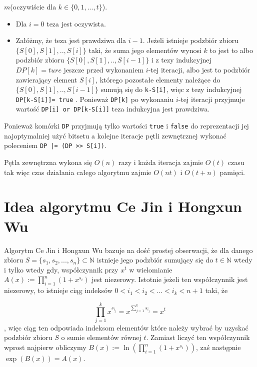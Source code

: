 \documentclass{article}
\begin{document}
 $m$(oczywiście dla $k \in \{0,1,...,t\}$). 
\begin{itemize}
    \item Dla $i = 0$ teza jest oczywista.
    \item Załóżmy, że teza jest prawdziwa dla $i-1$. Jeżeli istnieje podzbiór
    zbioru $\{S \left[ 0 \right],S\left[ 1 \right],..,S\left[ i \right]\}$ taki, że suma jego elementów wynosi $k$ to jest to 
    albo podzbiór zbioru $\{{S\left[0\right],S\left[1\right],..,S\left[i-1\right]\}}$ i z tezy indukcyjnej $DP[k]=ture$
    jeszcze przed wykonaniem $i$-tej iteracji, albo jest to podzbiór zawierający element
    $S\left[i \right]$, którego pozostałe elementy należące do 
    $\{S \left[ 0 \right] ,S \left[ 1 \right],..,S \left[ i-1 \right] \}$
     sumują się 
    do \texttt{k-S[i]}, więc z tezy indukcyjnej \texttt{DP[k-S[i]]= true} . Ponieważ \texttt{DP[k]} po wykonaniu $i$-tej iteracji
    przyjmuje wartość \texttt{DP[i] or DP[k-S[i]]} teza indukcyjna jest prawdziwa.

\end{itemize}
Ponieważ komórki \texttt{DP} przyjmują tylko wartości \texttt{true} i \texttt{false} do reprezentacji jej najoptymalniej
użyć bitsetu a kolejne iteracje pętli zewnętrznej wykonać poleceniem \texttt{DP |= (DP >> S[i])}.

Pętla zewnętrzna wykona się $O(n)$ razy i każda iteracja zajmie $O(t)$ czasu tak więc
czas działania całego algorytmu zajmie $O(nt)$ i $O(t+n)$ pamięci.



\section{Idea algorytmu Ce Jin i Hongxun Wu}


Algorytm Ce Jin i Hongxun Wu bazuje na dość prostej obserwacji, że dla danego zbioru
$S=\{s_1,s_2,...,s_n\} \subset \mathbb{N}$ istnieje jego podzbiór sumujący się do $t \in \mathbb{N}$ wtedy 
i tylko wtedy gdy, współczynnik przy $x^t$ w  wielomianie $A(x) :=\prod_{i = 1}^{n}(1+x^{s_i})$ jest 
niezerowy. Istotnie jeżeli ten współczynnik jest niezerowy, to istnieje ciąg indeksów $0<i_1<i_2<...<i_k<n+1$ taki, że 

$$\prod_{j=1}^{k}x^{s_{i_j}}=x^{\sum_{j=1}^ks_{i_j}}=x^t$$, więc ciąg ten odpowiada indeksom elementów które należy wybrać
by uzyskać podzbiór zbioru $S$ o sumie elementów równej $t$.
Zamiast liczyć ten współczynnik wprost najpierw obliczymy $B(x):=\ln(\prod_{i = 1}^{n}(1+x^{s_i}))$, 
zaś następnie $\exp(B(x)) = A(x)$. 
\end{document}
